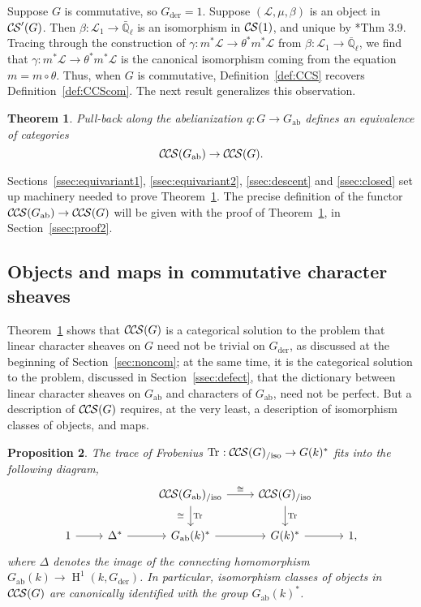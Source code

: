 \documentclass[10pt]{amsart}
\theoremstyle{plain}
\newtheorem{theorem}{Theorem}[section]
\newtheorem{proposition}[theorem]{Proposition}
\theoremstyle{definition}
\newcommand{\EE}{\mathbb{\bar Q}_\ell}
\newcommand{\Fq}{k}
\DeclareMathOperator{\Hh}{H}
\newcommand{\der}{_{\operatorname{der}}}
\newcommand{\ab}{_{\operatorname{ab}}}
\newcommand{\iso}{{\ \cong\ }}
\newcommand{\TrFrob}[1]{\operatorname{Tr}_{#1}}
\newcommand{\cs}[1]{{\mathcal{#1}}}
\newcommand{\CS}{{\mathcal{C\hskip-0.8pt S}}}
\newcommand{\CCS}{{\mathcal{C\hskip-.8pt C\hskip-0.8pt S}}}
\newcommand{\CCSiso}[1]{\CCS(#1)_{/\text{iso}}}
\begin{document}
Suppose $G$ is commutative, so $G\der = 1$. 
Suppose $(\cs{L},\mu,\beta)$ is an object in $\CS'(G)$.
Then $\beta : \cs{L}_1\to \EE$ is an isomorphism in $\CS(1)$, and unique by \cite{cunningham-roe:13a}*{Thm 3.9}.
Tracing through the construction of $\gamma : m^*\cs{L} \to \theta^*m^*\cs{L}$ from $\beta : \cs{L}_1\to \EE$, we find  that $\gamma : m^*\cs{L} \to \theta^*m^*\cs{L}$ is the canonical isomorphism coming from the equation $m = m \circ \theta$. 
Thus, when $G$ is commutative, Definition~\ref{def:CCS} recovers Definition~\ref{def:CCScom}.
The next result generalizes this observation.


\begin{theorem}\label{thm:Gab}
Pull-back along the abelianization $q : G \to G\ab$
defines an equivalence of categories
\[
\CCS(G\ab) \to \CCS(G).
\]
\end{theorem}
%
Sections~\ref{ssec:equivariant1}, \ref{ssec:equivariant2}, \ref{ssec:descent} and \ref{ssec:closed} set up machinery needed to prove Theorem~\ref{thm:Gab}.
The precise definition of the functor $\CCS(G\ab) \to \CCS(G)$ will be given with the proof of Theorem~\ref{thm:Gab}, in Section~\ref{ssec:proof2}.



\subsection{Objects and maps in commutative character sheaves}

Theorem~\ref{thm:Gab} shows that $\CCS(G)$ is a categorical solution to the problem that linear character sheaves on $G$ need not be trivial on $G\der$, as discussed at the beginning of Section~\ref{sec:noncom}; at the same time, it is the categorical solution to the problem, discussed in Section~\ref{ssec:defect}, that the dictionary between linear character sheaves on $G\ab$ and characters of $G\ab$, need not be perfect.
%
But a description of $\CCS(G)$ requires, at the very least, a description of isomorphism classes of objects, and maps. 
%

\begin{proposition}
The trace of Frobenius $\TrFrob{} : \CCSiso{G}\to G(\Fq)^*$ fits into the following diagram,
\[
\begin{tikzcd}
\ & & \CCSiso{G\ab} \arrow{d}{\TrFrob{}}[swap]{\iso} \arrow{r}{\iso} & \CCSiso{G} \arrow{d}{\TrFrob{}}& \\
1 \arrow{r} & \Delta^* \arrow{r} & G\ab(k)^* \arrow{r} & G(k)^* \arrow{r} & 1,
\end{tikzcd}
\]
where $\Delta$ denotes the image of the connecting homomorphism $G\ab(\Fq) \to \Hh^1(\Fq, G\der)$.
In particular, isomorphism classes of objects in $\CCS(G)$ are canonically identified with the group $G\ab(\Fq)^*$.
\end{proposition}
\end{document}

